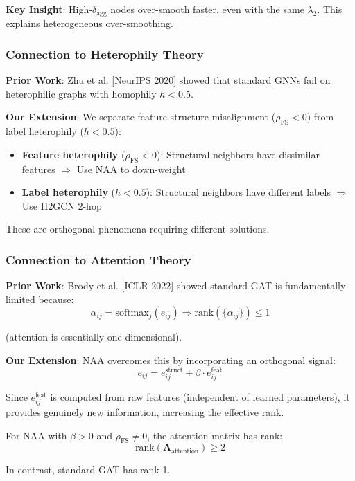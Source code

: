 \textbf{Key Insight}: High-$\delta_{\text{agg}}$ nodes over-smooth faster, even with the same $\lambda_2$. This explains heterogeneous over-smoothing.

\subsubsection{Connection to Heterophily Theory}

\textbf{Prior Work}: Zhu et al. [NeurIPS 2020] showed that standard GNNs fail on heterophilic graphs with homophily $h < 0.5$.

\textbf{Our Extension}: We separate feature-structure misalignment ($\rho_{\text{FS}} < 0$) from label heterophily ($h < 0.5$):
\begin{itemize}
\item \textbf{Feature heterophily} ($\rho_{\text{FS}} < 0$): Structural neighbors have dissimilar features $\Rightarrow$ Use NAA to down-weight
\item \textbf{Label heterophily} ($h < 0.5$): Structural neighbors have different labels $\Rightarrow$ Use H2GCN 2-hop
\end{itemize}

These are orthogonal phenomena requiring different solutions.

\subsubsection{Connection to Attention Theory}

\textbf{Prior Work}: Brody et al. [ICLR 2022] showed standard GAT is fundamentally limited because:
\begin{equation}
\alpha_{ij} = \text{softmax}_j(e_{ij}) \Rightarrow \text{rank}(\{\alpha_{ij}\}) \leq 1
\end{equation}

(attention is essentially one-dimensional).

\textbf{Our Extension}: NAA overcomes this by incorporating an orthogonal signal:
\begin{equation}
e_{ij} = e_{ij}^{\text{struct}} + \beta \cdot e_{ij}^{\text{feat}}
\end{equation}

Since $e_{ij}^{\text{feat}}$ is computed from raw features (independent of learned parameters), it provides genuinely new information, increasing the effective rank.

\begin{proposition}
\label{prop:attention_rank}
For NAA with $\beta > 0$ and $\rho_{\text{FS}} \neq 0$, the attention matrix has rank:
\begin{equation}
\text{rank}(\mathbf{A}_{\text{attention}}) \geq 2
\end{equation}

In contrast, standard GAT has rank 1.
\end{proposition}

